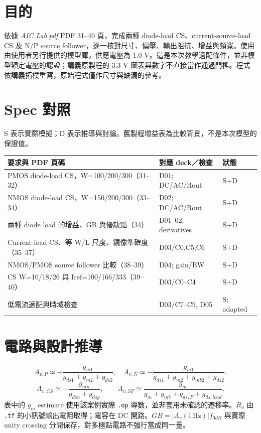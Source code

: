 \section{目的}
依據 \textit{AIC Lab.pdf} PDF 31--40 頁，完成兩種 diode-load CS、current-source-load CS 及 N/P source follower，逐一核對尺寸、偏壓、輸出阻抗、增益與頻寬。使用由使用者另行提供的模型庫，供應電壓為 1.0 V。這是本次教學適配條件，並非模型額定電壓的認證；講義原製程的 3.3 V 圖表與數字不直接當作通過門檻。程式依講義拓樸重寫，原始程式僅作尺寸與缺漏的參考。

\section{Spec 對照}
S 表示實際模擬；D 表示推導與討論。舊製程增益表為比較背景，不是本次模型的保證值。
\small\begin{longtable}{p{.46\linewidth}p{.30\linewidth}p{.15\linewidth}}\toprule
要求與 PDF 頁碼 & 對應 deck／檢查 & 狀態 \\ \midrule\endhead
PMOS diode-load CS，W=100/200/300（31--32） & D01; DC/AC/Rout & S+D \\
NMOS diode-load CS，W=150/200/300（33--34） & D02; DC/AC/Rout & S+D \\
兩種 diode load 的增益、GB 與優缺點（34） & D01--02; derivatives & S+D \\
Current-load CS、等 W/L 尺度、鏡像準確度（35--37） & D03/C0,C5,C6 & S+D \\
NMOS/PMOS source follower 比較（38--39） & D04; gain/BW & S+D \\
CS W=10/18/26 與 Iref=100/166/333（39--40） & D03/C0--C4 & S+D \\
低電流適配與時域檢查 & D03/C7--C9, D05 & S; adapted \\
\bottomrule\end{longtable}\normalsize


\section{電路與設計推導}
\[
A_{v,P}\simeq-\frac{g_{m1}}{g_{ds1}+g_{m2}+g_{ds2}},\quad
A_{v,N}\simeq-\frac{g_{m1}}{g_{ds1}+g_{m2}+g_{mb2}+g_{ds2}}.
\]
\[
A_{v,CS}\simeq-\frac{g_{mn}}{g_{dsn}+g_{dsp}},\qquad
A_{v,SF}\simeq\frac{g_m}{g_m+g_{mb}+g_{ds,F}+g_{ds,load}}.
\]表中的 $g_m$ estimate 使用該案例實際 \texttt{.op} 導數，並非套用未確認的遷移率。$R_o$ 由 \texttt{.tf} 的小訊號輸出電阻取得；電容在 DC 開路。$GB=|A_v(1\,\mathrm{Hz})|f_{3dB}$ 與實際 unity crossing 分開保存，對多極點電路不強行當成同一量。

